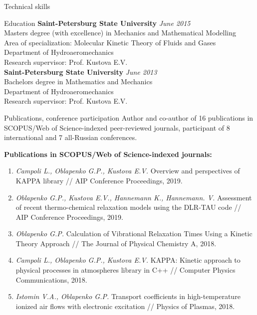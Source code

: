 \documentclass{resume} %
\begin{document}
\begin{rSection}{Technical skills}
\begin{rSection}{Education}
{\bf Saint-Petersburg State University} \hfill {\em June 2015} \\ 
Masters degree (with excellence) in Mechanics and Mathematical Modelling\\
Area of specialization: Molecular Kinetic Theory of Fluids and Gases\\
Department of Hydroaeromechanics \smallskip \\
Research supervisor: Prof. Kustova E.V. \\

{\bf Saint-Petersburg State University} \hfill {\em June 2013} \\ 
Bachelors degree in Mathematics and Mechanics \\
Department of Hydroaeromechanics \smallskip \\
Research supervisor: Prof. Kustova E.V. \\

\end{rSection}

\pagebreak

\begin{rSection}{Publications, conference participation}
Author and co-author of 16 publications in SCOPUS/Web of Science-indexed peer-reviewed journals, participant of 8 international and 7 all-Russian conferences.

{\bf Publications in SCOPUS/Web of Science-indexed journals:}

\begin{enumerate}

\item \emph{Campoli L., Oblapenko G.P., Kustova E.V.} Overview and perspectives of KAPPA library // AIP Conference Proceedings, 2019.

\item \emph{Oblapenko G.P., Kustova E.V., Hannemann K., Hannemann. V.} Assessment of recent thermo-chemical relaxation models using the DLR-TAU code // AIP Conference Proceedings, 2019.

\item \emph{Oblapenko G.P.} Calculation of Vibrational Relaxation Times Using a Kinetic Theory Approach // The Journal of Physical Chemistry A, 2018.

\item \emph{Campoli L., Oblapenko G.P., Kustova E.V.} KAPPA: Kinetic approach to physical processes in atmospheres library in C++ // Computer Physics Communications, 2018.

\item \emph{Istomin V.A., Oblapenko G.P.} Transport coefficients in high-temperature ionized air flows with electronic excitation // Physics of Plasmas, 2018.


\end{enumerate}
\end{rSection}
\end{rSection}
\end{document}
